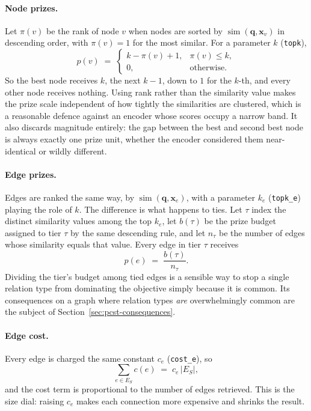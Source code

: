 \paragraph{Node prizes.} Let $\pi(v)$ be the rank of node $v$ when nodes are
sorted by $\operatorname{sim}(\mathbf{q}, \mathbf{x}_v)$ in descending order,
with $\pi(v) = 1$ for the most similar. For a parameter $k$ (\texttt{topk}),
%
\begin{equation}
p(v) \;=\;
\begin{cases}
k - \pi(v) + 1, & \pi(v) \leq k, \\
0, & \text{otherwise.}
\end{cases}
\label{eq:node-prizes}
\end{equation}
%
So the best node receives $k$, the next $k-1$, down to $1$ for the $k$-th, and
every other node receives nothing. Using rank rather than the similarity value
makes the prize scale independent of how tightly the similarities are clustered,
which is a reasonable defence against an encoder whose scores occupy a narrow
band. It also discards magnitude entirely: the gap between the best and second
best node is always exactly one prize unit, whether the encoder considered them
near-identical or wildly different.

\paragraph{Edge prizes.} Edges are ranked the same way, by
$\operatorname{sim}(\mathbf{q}, \mathbf{x}_e)$, with a parameter $k_e$
(\texttt{topk\_e}) playing the role of $k$. The difference is what happens to
ties. Let $\tau$ index the distinct similarity values among the top $k_e$, let
$b(\tau)$ be the prize budget assigned to tier $\tau$ by the same descending
rule, and let $n_\tau$ be the number of edges whose similarity equals that
value. Every edge in tier $\tau$ receives
%
\begin{equation}
p(e) \;=\; \frac{b(\tau)}{n_\tau}.
\label{eq:edge-prizes}
\end{equation}
%
Dividing the tier's budget among tied edges is a sensible way to stop a single
relation type from dominating the objective simply because it is common. Its
consequences on a graph where relation types \emph{are} overwhelmingly common are
the subject of Section~\ref{sec:pcst-consequences}.

\paragraph{Edge cost.} Every edge is charged the same constant $c_e$
(\texttt{cost\_e}), so
%
\begin{equation}
\sum_{e \in E_S} c(e) \;=\; c_e \, \lvert E_S \rvert ,
\label{eq:edge-cost}
\end{equation}
%
and the cost term is proportional to the number of edges retrieved. This is the
size dial: raising $c_e$ makes each connection more expensive and shrinks the
result.

